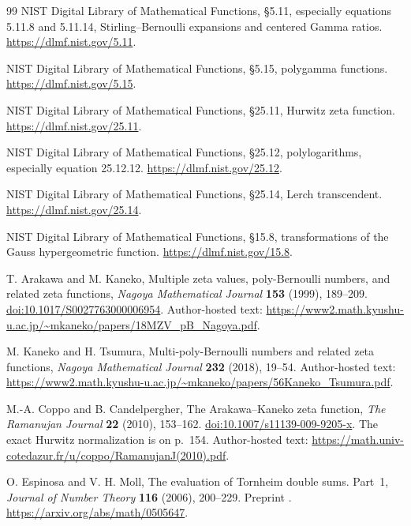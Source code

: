\begin{thebibliography}{99}
NIST Digital Library of Mathematical Functions,
\S5.11, especially equations 5.11.8 and 5.11.14,
Stirling--Bernoulli expansions and centered Gamma ratios.
\url{https://dlmf.nist.gov/5.11}.

NIST Digital Library of Mathematical Functions,
\S5.15, polygamma functions.
\url{https://dlmf.nist.gov/5.15}.

NIST Digital Library of Mathematical Functions,
\S25.11, Hurwitz zeta function.
\url{https://dlmf.nist.gov/25.11}.

NIST Digital Library of Mathematical Functions,
\S25.12, polylogarithms, especially equation 25.12.12.
\url{https://dlmf.nist.gov/25.12}.

NIST Digital Library of Mathematical Functions,
\S25.14, Lerch transcendent.
\url{https://dlmf.nist.gov/25.14}.

NIST Digital Library of Mathematical Functions,
\S15.8, transformations of the Gauss hypergeometric function.
\url{https://dlmf.nist.gov/15.8}.

T. Arakawa and M. Kaneko,
Multiple zeta values, poly-Bernoulli numbers, and related zeta functions,
\emph{Nagoya Mathematical Journal} \textbf{153} (1999), 189--209.
\href{https://doi.org/10.1017/S0027763000006954}{doi:10.1017/S0027763000006954}.
Author-hosted text:
\url{https://www2.math.kyushu-u.ac.jp/~mkaneko/papers/18MZV_pB_Nagoya.pdf}.

M. Kaneko and H. Tsumura,
Multi-poly-Bernoulli numbers and related zeta functions,
\emph{Nagoya Mathematical Journal} \textbf{232} (2018), 19--54.
Author-hosted text:
\url{https://www2.math.kyushu-u.ac.jp/~mkaneko/papers/56Kaneko_Tsumura.pdf}.

M.-A. Coppo and B. Candelpergher,
The Arakawa--Kaneko zeta function,
\emph{The Ramanujan Journal} \textbf{22} (2010), 153--162.
\href{https://doi.org/10.1007/s11139-009-9205-x}{doi:10.1007/s11139-009-9205-x}.
The exact Hurwitz normalization is on p.~154.
Author-hosted text:
\url{https://math.univ-cotedazur.fr/u/coppo/RamanujanJ(2010).pdf}.

O. Espinosa and V. H. Moll,
The evaluation of Tornheim double sums. Part~1,
\emph{Journal of Number Theory} \textbf{116} (2006), 200--229.
Preprint .
\url{https://arxiv.org/abs/math/0505647}.

\end{thebibliography}
